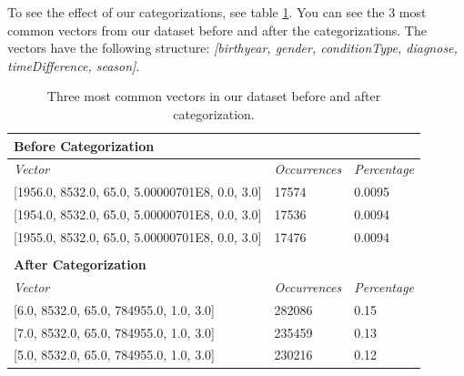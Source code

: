 To see the effect of our categorizations, see table \ref{tab:general}. You can see the $3$ most common vectors from our dataset before and after the categorizations. The vectors have the following structure: \textit{{[}birthyear, gender, conditionType, diagnose, timeDifference, season{]}}. \\

\begin{table}[!htb]
\centering

\begin{tabular}{lll}
\hline
\textbf{Before Categorization}                                                    &                             &                     \\ \hline
\textit{Vector} & \textit{Occurrences}        & \textit{Percentage} \\ \hline
\multicolumn{1}{l|}{{[}1956.0, 8532.0, 65.0, 5.00000701E8, 0.0, 3.0{]}}           & \multicolumn{1}{l|}{17574}  & 0.0095              \\
\multicolumn{1}{l|}{{[}1954.0, 8532.0, 65.0, 5.00000701E8, 0.0, 3.0{]}}           & \multicolumn{1}{l|}{17536}  & 0.0094              \\
\multicolumn{1}{l|}{{[}1955.0, 8532.0, 65.0, 5.00000701E8, 0.0, 3.0{]}}           & \multicolumn{1}{l|}{17476}  & 0.0094              \\
                                                                                  &                             &                     \\ \hline
\textbf{After Categorization}                                                     &                             &                     \\ \hline
\textit{Vector} & \textit{Occurrences}        & \textit{Percentage} \\ \hline
\multicolumn{1}{l|}{{[}6.0, 8532.0, 65.0, 784955.0, 1.0, 3.0{]}}                  & \multicolumn{1}{l|}{282086} & 0.15                \\
\multicolumn{1}{l|}{{[}7.0, 8532.0, 65.0, 784955.0, 1.0, 3.0{]}}                  & \multicolumn{1}{l|}{235459} & 0.13                \\
\multicolumn{1}{l|}{{[}5.0, 8532.0, 65.0, 784955.0, 1.0, 3.0{]}}                  & \multicolumn{1}{l|}{230216} & 0.12               
\end{tabular}

\caption{Three most common vectors in our dataset before and after categorization.}
\label{tab:general}
\end{table}


